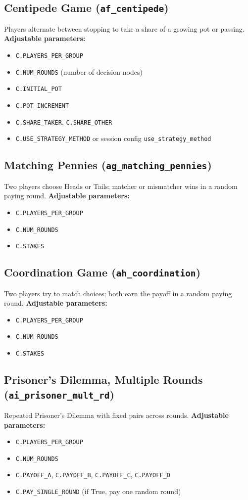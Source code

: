 \documentclass[11pt]{article}
\begin{document}
\subsection*{Centipede Game (\texttt{af\_centipede})}
Players alternate between stopping to take a share of a growing pot or passing.
\textbf{Adjustable parameters:}
\begin{itemize}
\item \texttt{C.PLAYERS\_PER\_GROUP}
\item \texttt{C.NUM\_ROUNDS} (number of decision nodes)
\item \texttt{C.INITIAL\_POT}
\item \texttt{C.POT\_INCREMENT}
\item \texttt{C.SHARE\_TAKER}, \texttt{C.SHARE\_OTHER}
\item \texttt{C.USE\_STRATEGY\_METHOD} or session config \texttt{use\_strategy\_method}
\end{itemize}

\subsection*{Matching Pennies (\texttt{ag\_matching\_pennies})}
Two players choose Heads or Tails; matcher or mismatcher wins in a random paying round.
\textbf{Adjustable parameters:}
\begin{itemize}
\item \texttt{C.PLAYERS\_PER\_GROUP}
\item \texttt{C.NUM\_ROUNDS}
\item \texttt{C.STAKES}
\end{itemize}

\subsection*{Coordination Game (\texttt{ah\_coordination})}
Two players try to match choices; both earn the payoff in a random paying round.
\textbf{Adjustable parameters:}
\begin{itemize}
\item \texttt{C.PLAYERS\_PER\_GROUP}
\item \texttt{C.NUM\_ROUNDS}
\item \texttt{C.STAKES}
\end{itemize}

\subsection*{Prisoner's Dilemma, Multiple Rounds (\texttt{ai\_prisoner\_mult\_rd})}
Repeated Prisoner's Dilemma with fixed pairs across rounds.
\textbf{Adjustable parameters:}
\begin{itemize}
\item \texttt{C.PLAYERS\_PER\_GROUP}
\item \texttt{C.NUM\_ROUNDS}
\item \texttt{C.PAYOFF\_A}, \texttt{C.PAYOFF\_B}, \texttt{C.PAYOFF\_C}, \texttt{C.PAYOFF\_D}
\item \texttt{C.PAY\_SINGLE\_ROUND} (if True, pay one random round)
\end{itemize}
\end{document}
